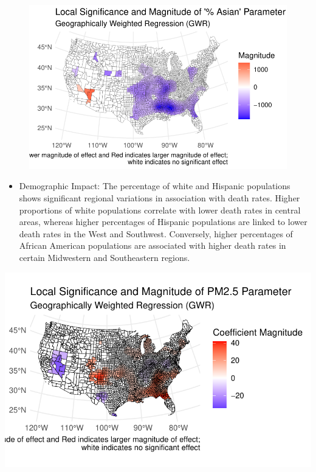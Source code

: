 \documentclass[
]{article}
\providecommand{\tightlist}{%
  \setlength{\itemsep}{0pt}\setlength{\parskip}{0pt}}\usepackage{longtable,booktabs,array}
\begin{document}
\begin{figure}
%
\begin{minipage}{0.50\linewidth}
\includegraphics{report_files/figure-pdf/unnamed-chunk-4-4.pdf}\end{minipage}%

\end{figure}%

\begin{itemize}
\tightlist
\item
  Demographic Impact: The percentage of white and Hispanic populations
  shows significant regional variations in association with death rates.
  Higher proportions of white populations correlate with lower death
  rates in central areas, whereas higher percentages of Hispanic
  populations are linked to lower death rates in the West and Southwest.
  Conversely, higher percentages of African American populations are
  associated with higher death rates in certain Midwestern and
  Southeastern regions.
\end{itemize}

\includegraphics{report_files/figure-pdf/unnamed-chunk-5-1.pdf}
\end{document}
